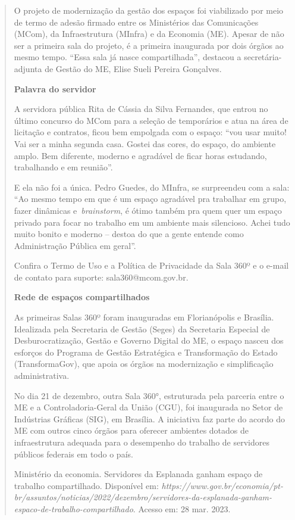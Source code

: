 \begin{quote}
O projeto de modernização da gestão dos espaços foi viabilizado por meio
de termo de adesão firmado entre os Ministérios das Comunicações (MCom),
da Infraestrutura (MInfra) e da Economia (ME). Apesar de não ser a
primeira sala do projeto, é a primeira inaugurada por dois órgãos ao
mesmo tempo. ``Essa sala já nasce compartilhada'', destacou a
secretária-adjunta de Gestão do ME, Elise Sueli Pereira Gonçalves.

\textbf{Palavra do servidor}

A servidora pública Rita de Cássia da Silva Fernandes, que entrou no
último concurso do MCom para a seleção de temporários e atua na área de
licitação e contratos, ficou bem empolgada com o espaço: ``vou usar
muito! Vai ser a minha segunda casa. Gostei das cores, do espaço, do
ambiente amplo. Bem diferente, moderno e agradável de ficar horas
estudando, trabalhando e em reunião''.

E ela não foi a única. Pedro Guedes, do MInfra, se surpreendeu com a
sala: ``Ao mesmo tempo em que é um espaço agradável pra trabalhar em
grupo, fazer dinâmicas e~\emph{brainstorm}, é ótimo também pra quem quer
um espaço privado para focar no trabalho em um ambiente mais silencioso.
Achei tudo muito bonito e moderno -- destoa do que a gente entende como
Administração Pública em geral''.

Confira o Termo de Uso e a Política de Privacidade da Sala 360º e o e-mail de contato
para
suporte: sala360@mcom.gov.br.

\textbf{Rede de espaços compartilhados}

As primeiras Salas 360º foram inauguradas em Florianópolis e Brasília.
Idealizada pela Secretaria de Gestão (Seges) da Secretaria Especial de
Desburocratização, Gestão e Governo Digital do ME, o espaço nasceu dos
esforços do Programa de Gestão Estratégica e Transformação do Estado
(TransformaGov), que apoia os órgãos na modernização e simplificação
administrativa.

No dia 21 de dezembro, outra Sala 360°, estruturada pela parceria entre
o ME e a Controladoria-Geral da União (CGU), foi inaugurada no Setor de
Indústrias Gráficas (SIG), em Brasília. A iniciativa faz parte do acordo
do ME com outros cinco órgãos para oferecer ambientes dotados de
infraestrutura adequada para o desempenho do trabalho de servidores
públicos federais em todo o país.

Ministério da economia. Servidores da Esplanada ganham espaço de
trabalho compartilhado. Disponível em:
\textit{https://www.gov.br/economia/pt-br/assuntos/noticias/2022/dezembro/servidores-da-esplanada-ganham-espaco-de-trabalho-compartilhado}.
Acesso em: 28 mar. 2023.
\end{quote}


